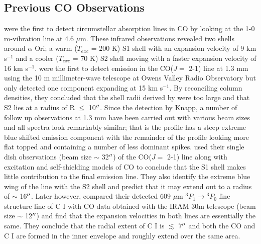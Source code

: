 \documentclass[iop]{emulateapj}
\begin{document}
\subsection{Previous CO Observations}
\cite{1979ApJ...233L.135B} were the first to detect circumstellar absorption lines in CO by looking at the 1-0 ro-vibration line at 4.6 $\mu$m. These infrared observations revealed two shells around $\alpha$ Ori; a warm (\rm{$T_{exc}$} = 200 K) S1 shell with an expansion velocity of 9 km s${}^{-1}$ and a cooler (\rm{$T_{exc}$} = 70 K) S2 shell moving with a faster expansion velocity of 16 km s${}^{-1}$.   \cite{1980ApJ...242L..25K} were the first to detect emission in the CO($J=$ 2-1) line at 1.3 mm using the 10 m millimeter-wave telescope at Owens Valley Radio Observatory but only detected one component expanding at 15 km s${}^{-1}$. By reconciling column densities, they concluded that the shell radii derived by \cite{1979ApJ...233L.135B} were too large and that S2 lies at a radius of R $\leq$ 10$\mbox{$^{\prime\prime}$}$. Since the detection by Knapp, a number of follow up observations at 1.3 mm have been carried out with various beam sizes and all spectra look remarkably similar; that is the profile has a steep extreme blue shifted emission component with the remainder of the profile looking more flat topped and containing a number of less dominant spikes. \cite{1987ApJ...313..400H} used their single dish observations (beam size $\sim$ 32$\mbox{$^{\prime\prime}$}$) of the CO($J=$ 2-1) line along with excitation and self-shielding models of CO to conclude that the S1 shell makes little contribution to the final emission line. They also identify the extreme blue wing of the line with the S2 shell and predict that it may extend out to a radius of $\sim$ 16$\mbox{$^{\prime\prime}$}$. Later however, \cite{1994ApJ...424L.127H} compared their detected 609 $\mu$m ${}^3P{}_1\rightarrow{}^3P{}_0$ fine structure line of C I with CO data obtained with the IRAM 30m telescope (beam size $\sim$ 12$\mbox{$^{\prime\prime}$}$) and find that the expansion velocities in both lines are essentially the same. They conclude that the radial extent of C I is $\lesssim$ 7$\mbox{$^{\prime\prime}$}$ and both the CO and C I are formed in the inner envelope and roughly extend over the same area.  
\end{document}
